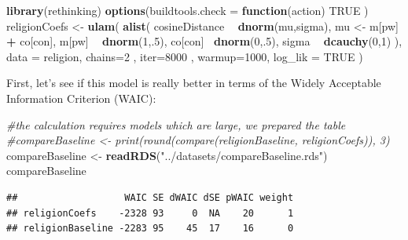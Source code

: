 \documentclass[]{book}
\newenvironment{Shaded}{\begin{snugshade}}{\end{snugshade}}
\newcommand{\KeywordTok}[1]{\textcolor[rgb]{0.13,0.29,0.53}{\textbf{#1}}}
\newcommand{\DataTypeTok}[1]{\textcolor[rgb]{0.13,0.29,0.53}{#1}}
\newcommand{\DecValTok}[1]{\textcolor[rgb]{0.00,0.00,0.81}{#1}}
\newcommand{\StringTok}[1]{\textcolor[rgb]{0.31,0.60,0.02}{#1}}
\newcommand{\CommentTok}[1]{\textcolor[rgb]{0.56,0.35,0.01}{\textit{#1}}}
\newcommand{\OtherTok}[1]{\textcolor[rgb]{0.56,0.35,0.01}{#1}}
\newcommand{\ControlFlowTok}[1]{\textcolor[rgb]{0.13,0.29,0.53}{\textbf{#1}}}
\newcommand{\OperatorTok}[1]{\textcolor[rgb]{0.81,0.36,0.00}{\textbf{#1}}}
\newcommand{\NormalTok}[1]{#1}
\begin{document}
\vspace{1mm} \footnotesize

\begin{Shaded}
\begin{Highlighting}[]
\KeywordTok{library}\NormalTok{(rethinking)}
\KeywordTok{options}\NormalTok{(}\DataTypeTok{buildtools.check =} \ControlFlowTok{function}\NormalTok{(action) }\OtherTok{TRUE}\NormalTok{ )}
\NormalTok{religionCoefs <-}\StringTok{ }\KeywordTok{ulam}\NormalTok{(}
  \KeywordTok{alist}\NormalTok{(}
\NormalTok{    cosineDistance }\OperatorTok{~}\StringTok{ }\KeywordTok{dnorm}\NormalTok{(mu,sigma),}
\NormalTok{    mu <-}\StringTok{ }\NormalTok{m[pw] }\OperatorTok{+}\StringTok{ }\NormalTok{co[con],}
\NormalTok{    m[pw] }\OperatorTok{~}\StringTok{ }\KeywordTok{dnorm}\NormalTok{(}\DecValTok{1}\NormalTok{,.}\DecValTok{5}\NormalTok{),}
\NormalTok{    co[con] }\OperatorTok{~}\KeywordTok{dnorm}\NormalTok{(}\DecValTok{0}\NormalTok{,.}\DecValTok{5}\NormalTok{),}
\NormalTok{    sigma }\OperatorTok{~}\StringTok{ }\KeywordTok{dcauchy}\NormalTok{(}\DecValTok{0}\NormalTok{,}\DecValTok{1}\NormalTok{)}
\NormalTok{  ),}
  \DataTypeTok{data =}\NormalTok{ religion,}
  \DataTypeTok{chains=}\DecValTok{2}\NormalTok{ , }\DataTypeTok{iter=}\DecValTok{8000}\NormalTok{ , }\DataTypeTok{warmup=}\DecValTok{1000}\NormalTok{, }
  \DataTypeTok{log_lik =} \OtherTok{TRUE}
\NormalTok{)}
\end{Highlighting}
\end{Shaded}

\normalsize

\noindent First, let's see if this model is really better in terms of
the Widely Acceptable Information Criterion (WAIC):

\vspace{1mm} \footnotesize

\begin{Shaded}
\begin{Highlighting}[]
\CommentTok{#the calculation requires models which are large, we prepared the table}
\CommentTok{#compareBaseline <- print(round(compare(religionBaseline, religionCoefs)), 3)}
\NormalTok{compareBaseline <-}\StringTok{ }\KeywordTok{readRDS}\NormalTok{(}\StringTok{"../datasets/compareBaseline.rds"}\NormalTok{)}
\NormalTok{compareBaseline}
\end{Highlighting}
\end{Shaded}

\begin{verbatim}
##                   WAIC SE dWAIC dSE pWAIC weight
## religionCoefs    -2328 93     0  NA    20      1
## religionBaseline -2283 95    45  17    16      0
\end{verbatim}
\end{document}
